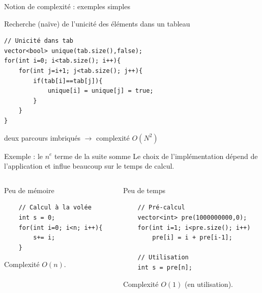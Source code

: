 \documentclass{beamer}
\begin{document}
\begin{frame}[fragile]{Notion de complexité : exemples simples}
\begin{exampleblock}{Recherche (naïve) de l'unicité des éléments dans un tableau}
\begin{verbatim}
// Unicité dans tab
vector<bool> unique(tab.size(),false);
for(int i=0; i<tab.size(); i++){
    for(int j=i+1; j<tab.size(); j++){
        if(tab[i]==tab[j]){
            unique[i] = unique[j] = true;
        }
    }
}
\end{verbatim}
deux parcours imbriqués $\rightarrow$ complexité $O(N^2)$
\end{exampleblock}
\end{frame}

\begin{frame}[fragile]{Exemple : le $n^e$ terme de la suite somme}
Le choix de l'implémentation dépend de l'application et influe beaucoup sur le temps de calcul.
\begin{columns}
    \begin{column}{0.5\textwidth}
    \begin{block}{Peu de mémoire}
    \begin{verbatim}
    // Calcul à la volée
    int s = 0;
    for(int i=0; i<n; i++){
        s+= i;
    }
    \end{verbatim}
    Complexité $O(n)$.
    \end{block}
    \end{column}
    \begin{column}{0.5\textwidth}
    \begin{block}{Peu de temps}
    \begin{verbatim}
    // Pré-calcul
    vector<int> pre(1000000000,0);
    for(int i=1; i<pre.size(); i++)
        pre[i] = i + pre[i-1];

    // Utilisation
    int s = pre[n];
    \end{verbatim}
    Complexité $O(1)$ (en utilisation).
    \end{block}
    \end{column}
\end{columns}
\end{frame}
\end{document}
